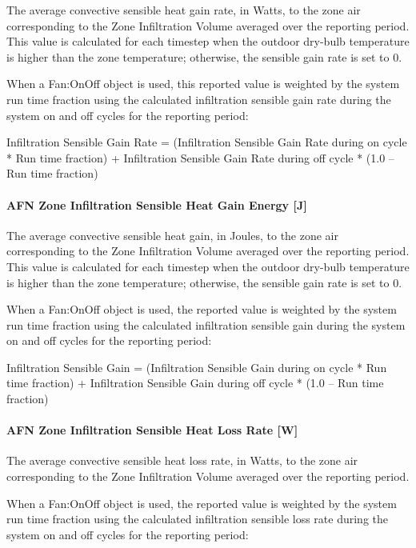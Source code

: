 The average convective sensible heat gain rate, in Watts, to the zone air corresponding to the Zone Infiltration Volume averaged over the reporting period. This value is calculated for each timestep when the outdoor dry-bulb temperature is higher than the zone temperature; otherwise, the sensible gain rate is set to 0.

When a Fan:OnOff object is used, this reported value is weighted by the system run time fraction using the calculated infiltration sensible gain rate during the system on and off cycles for the reporting period:

Infiltration Sensible Gain Rate = (Infiltration Sensible Gain Rate during on cycle * Run time fraction) + Infiltration Sensible Gain Rate during off cycle * (1.0 -- Run time fraction)

\paragraph{AFN Zone Infiltration Sensible Heat Gain Energy {[}J{]}}\label{afn-zone-infiltration-sensible-heat-gain-energy-j}

The average convective sensible heat gain, in Joules, to the zone air corresponding to the Zone Infiltration Volume averaged over the reporting period. This value is calculated for each timestep when the outdoor dry-bulb temperature is higher than the zone temperature; otherwise, the sensible gain rate is set to 0.

When a Fan:OnOff object is used, the reported value is weighted by the system run time fraction using the calculated infiltration sensible gain during the system on and off cycles for the reporting period:

Infiltration Sensible Gain = (Infiltration Sensible Gain during on cycle * Run time fraction) + Infiltration Sensible Gain during off cycle * (1.0 -- Run time fraction)

\paragraph{AFN Zone Infiltration Sensible Heat Loss Rate {[}W{]}}\label{afn-zone-infiltration-sensible-heat-loss-rate-w}

The average convective sensible heat loss rate, in Watts, to the zone air corresponding to the Zone Infiltration Volume averaged over the reporting period.

When a Fan:OnOff object is used, the reported value is weighted by the system run time fraction using the calculated infiltration sensible loss rate during the system on and off cycles for the reporting period:

